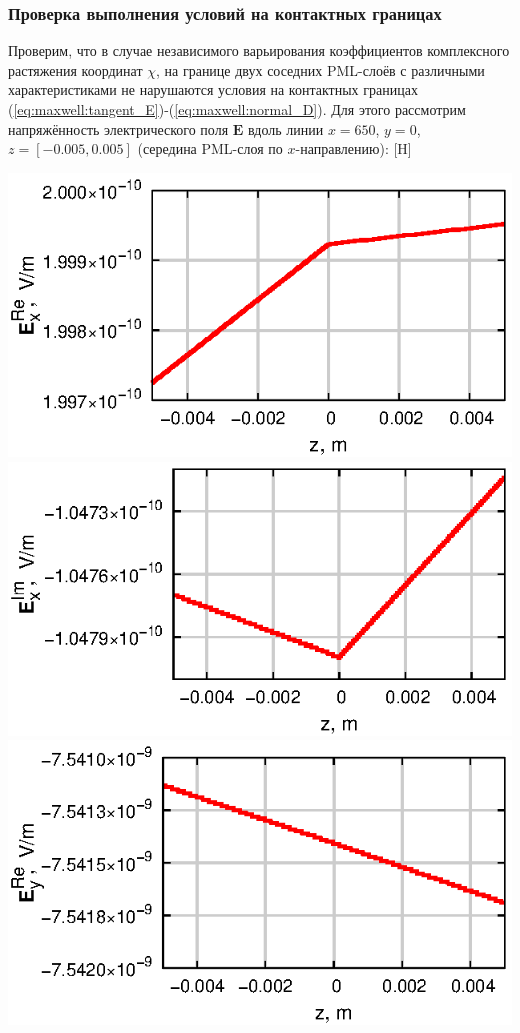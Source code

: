 \documentclass[a4paper,14pt]{article}
\makeatletter
\renewenvironment{figure}[1][\fps@figure]{
  \edef\@tempa{\noexpand\@float{figure}[#1]}
  \@tempa
  \addtocounter{foofigure}{1}
}{
  \end@float
}
\makeatother
\begin{document}
\subsubsection{Проверка выполнения условий на контактных границах}
Проверим, что в случае независимого варьирования коэффициентов комплексного растяжения координат $\chi$, на границе двух соседних PML-слоёв с различными характеристиками не нарушаются условия на контактных границах (\ref{eq:maxwell:tangent_E})-(\ref{eq:maxwell:normal_D}). Для этого рассмотрим напряжённость электрического поля $\mathbf{E}$ вдоль линии $x = 650$, $y = 0$, $z = [-0.005, 0.005]$ (середина PML-слоя по $x$-направлению):
\begin{figure}[H]
	\centering
	\includegraphics[scale=1]{research-2/650/ExR.eps}
	\includegraphics[scale=1]{research-2/650/ExI.eps}
	\includegraphics[scale=1]{research-2/650/EyR.eps}

\end{figure}
\end{document}
